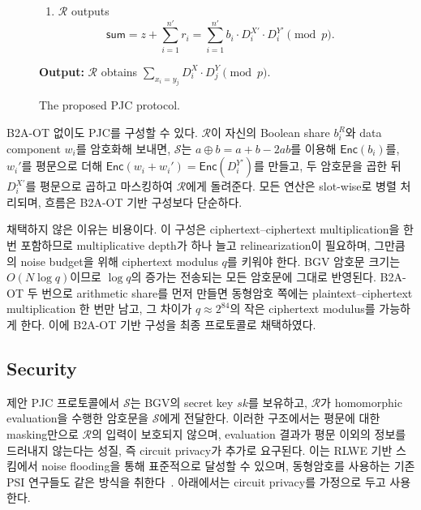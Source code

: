 \documentclass[sigconf,anonymous,review]{acmart}
\newcommand{\Snd}{\mathcal{S}}
\newcommand{\Rcv}{\mathcal{R}}
\begin{document}
\begin{figure}[t]
{\begin{minipage}{0.95\columnwidth}
\begin{enumerate}[label=(\arabic*), leftmargin=*]
    \item
    $\mathcal{R}$ outputs
    \[
        \mathsf{sum}
        =
        z+\sum_{i=1}^{n'}r_i
        =
        \sum_{i=1}^{n'}
        b_i\cdot D_i^{X'}\cdot D_i^{Y'}
        \pmod p.
    \]
\end{enumerate}

\noindent\textbf{Output:}
$\mathcal{R}$ obtains
$
\sum_{x_i=y_j}
D_i^X\cdot D_j^Y
\pmod p
$.

\end{minipage}%
}
\caption{The proposed PJC protocol.}
\label{fig:our-pjc}
\end{figure}




B2A-OT 없이도 PJC를 구성할 수 있다. $\mathcal{R}$이 자신의 Boolean share
$b_i^R$와 data component $w_i$를 암호화해 보내면, $\mathcal{S}$는
$a\oplus b=a+b-2ab$를 이용해 $\mathsf{Enc}(b_i)$를, $w_i'$를 평문으로 더해
$\mathsf{Enc}(w_i+w_i')=\mathsf{Enc}(D_i^{Y'})$를 만들고, 두 암호문을 곱한 뒤
$D_i^{X'}$를 평문으로 곱하고 마스킹하여 $\mathcal{R}$에게 돌려준다. 모든 연산은
slot-wise로 병렬 처리되며, 흐름은 B2A-OT 기반 구성보다 단순하다.

채택하지 않은 이유는 비용이다. 이 구성은 ciphertext--ciphertext multiplication을
한 번 포함하므로 multiplicative depth가 하나 늘고 relinearization이 필요하며,
그만큼의 noise budget을 위해 ciphertext modulus $q$를 키워야 한다. BGV 암호문
크기는 $O(N\log q)$이므로 $\log q$의 증가는 전송되는 모든 암호문에 그대로
반영된다. B2A-OT 두 번으로 arithmetic share를 먼저 만들면 동형암호 쪽에는
plaintext--ciphertext multiplication 한 번만 남고, 그 차이가 $q\approx2^{84}$의
작은 ciphertext modulus를 가능하게 한다. 이에 B2A-OT 기반 구성을 최종 프로토콜로
채택하였다.

\subsection{Security}\label{sec:security-pjc}

제안 PJC 프로토콜에서 $\Snd$는 BGV의 secret key $sk$를 보유하고, $\Rcv$가
homomorphic evaluation을 수행한 암호문을 $\Snd$에게 전달한다. 이러한 구조에서는
평문에 대한 masking만으로 $\Rcv$의 입력이 보호되지 않으며, evaluation 결과가
평문 이외의 정보를 드러내지 않는다는 성질, 즉 circuit privacy가 추가로
요구된다. 이는 RLWE 기반 스킴에서 noise flooding을 통해 표준적으로 달성할 수
있으며, 동형암호를 사용하는 기존 PSI 연구들도 같은 방식을
취한다~\cite{CLR17,PEPSI}. 아래에서는 circuit privacy를 가정으로 두고 사용한다.
\end{document}
